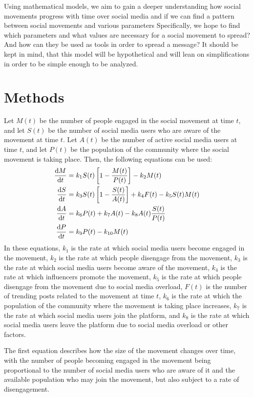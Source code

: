 \documentclass{article}
\begin{document}
    Using mathematical models, we aim to gain a deeper understanding how social movements progress with time over social media and if we can find a pattern between social movements and various parameters Specifically, we hope to find which parameters and what values are necessary for a social movement to spread? And how can they be used as tools in order to spread a message?
    It should be kept in mind, that this model will be hypothetical and will lean on simplifications in order to be simple enough to be analyzed.
    
    \section{Methods}
        Let $M(t)$ be the number of people engaged in the social movement at time $t$, and let $S(t)$ be the number of social media users who are aware of the movement at time $t$. Let $A(t)$ be the number of active social media users at time $t$, and let $P(t)$ be the population of the community where the social movement is taking place. Then, the following equations can be used:
        \begin{align}
            \diff Mt &= k_1 S(t) \left[1 - \frac{M(t)}{P(t)}\right] - k_2M(t)
            \\
            \diff St &= k_3 S(t)\left[1 - \frac{S(t)}{A(t)}\right] + k_4 F(t) - k_5 S(t)M(t)
            \\
            \diff At &= k_6 P(t) + k_7A(t) - k_8A(t)\frac{S(t)}{P(t)}
            \\
            \diff Pt &= k_9 P(t) - k_{10}M(t)
        \end{align}
        In these equations, $k_1$ is the rate at which social media users become engaged in the movement, $k_2$ is the rate at which people disengage from the movement, $k_3$ is the rate at which social media users become aware of the movement, $k_4$ is the rate at which influencers promote the movement, $k_5$ is the rate at which people disengage from the movement due to social media overload, $F(t)$ is the number of trending posts related to the movement at time $t$, $k_6$ is the rate at which the population of the community where the movement is taking place increases, $k_7$ is the rate at which social media users join the platform, and $k_8$ is the rate at which social media users leave the platform due to social media overload or other factors.
        
        The first equation describes how the size of the movement changes over time, with the number of people becoming engaged in the movement being proportional to the number of social media users who are aware of it and the available population who may join the movement, but also subject to a rate of disengagement.
        
\end{document}
